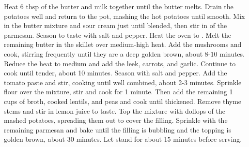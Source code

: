\begin{recipe}
{	\step Heat 6 tbsp of the butter and milk together until the butter melts.
	\step Drain the potatoes well and return to the pot, mashing the hot potatoes until smooth. Mix in the butter mixture and sour cream just until blended, then stir in  of the parmesan. Season to taste with salt and pepper.
	\step Heat the oven to \unit[375]{\faren}. Melt the remaining butter in the skillet over medium-high heat. Add the mushrooms and cook, stirring frequently until they are a deep golden brown, about 8-10 minutes.
	\step Reduce the heat to medium and add the leek, carrots, and garlic. Continue to cook until tender, about 10 minutes. Season with salt and pepper.
	\step Add the tomato paste and stir, cooking until well combined, about 2-3 minutes.
	\step Sprinkle flour over the mixture, stir and cook for 1 minute. Then add the remaining 1 cups of broth, cooked lentils, and peas and cook until thickened. Remove thyme stems and stir in lemon juice to taste.
	\step Top the mixture with dollops of the mashed potatoes, spreading them out to cover the filling. Sprinkle with the remaining parmesan and bake until the filling is bubbling and the topping is golden brown, about 30 minutes. Let stand for about 15 minutes before serving.
}
\end{recipe}
